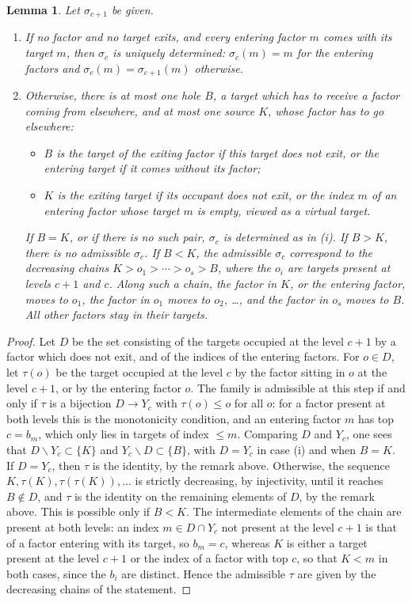 \documentclass[a4paper,12pt,leqno]{amsart}
\theoremstyle{plain}
\newtheorem{lemma}[thm]{Lemma}
\theoremstyle{definition}
\theoremstyle{definition}
\begin{document}
\begin{lemma}\label{lem:chains} Let $\sigma_{c+1}$ be given.
\begin{enumerate}
\item[(i)] If no factor and no target exits, and every entering factor $m$ comes with its target $m$,
then $\sigma_c$ is uniquely determined: $\sigma_c(m)=m$ for the entering factors and
$\sigma_c(m)=\sigma_{c+1}(m)$ otherwise.
\item[(ii)] Otherwise, there is at most one \emph{hole} $B$, a target which has to receive a factor
coming from elsewhere, and at most one \emph{source} $K$, whose factor has to go elsewhere:
\begin{itemize}
\item $B$ is the target of the exiting factor if this target does not exit, or the entering target if
it comes without its factor;
\item $K$ is the exiting target if its occupant does not exit, or the index $m$ of an entering
factor whose target $m$ is empty, viewed as a virtual target.
\end{itemize}
If $B=K$, or if there is no such pair, $\sigma_c$ is determined as in (i). If $B>K$, there is no
admissible $\sigma_c$. If $B<K$, the admissible $\sigma_c$ correspond to the decreasing chains
$K>o_1>\cdots>o_s>B$, where the $o_i$ are targets present at levels $c+1$ and $c$. Along such a
chain, the factor in $K$, or the entering factor, moves to $o_1$, the factor in $o_1$ moves to
$o_2$, …, and the factor in $o_s$ moves to $B$. All other factors stay in their targets.
\end{enumerate}
\end{lemma}

\begin{proof}
Let $D$ be the set consisting of the targets occupied at the level $c+1$ by a factor which does not
exit, and of the indices of the entering factors. For $o\in D$, let $\tau(o)$ be the target occupied
at the level $c$ by the factor sitting in $o$ at the level $c+1$, or by the entering factor $o$.
The family is admissible at this step if and only if $\tau$ is a bijection $D\rightarrow Y_c$ with
$\tau(o)\leq o$ for all $o$: for a factor present at both levels this is the monotonicity
condition, and an entering factor $m$ has top $c=b_m$, which only lies in targets of index $\leq m$.
Comparing $D$ and $Y_c$, one sees that $D\smallsetminus Y_c\subset\{K\}$ and $Y_c\smallsetminus
D\subset\{B\}$, with $D=Y_c$ in case (i) and when $B=K$. If $D=Y_c$, then $\tau$ is the identity,
by the remark above. Otherwise, the sequence $K,\tau(K),\tau(\tau(K)),\ldots$ is strictly
decreasing, by injectivity, until it reaches $B\notin D$, and $\tau$ is the identity on the
remaining elements of $D$, by the remark above. This is possible only if $B<K$. The intermediate
elements of the chain are present at both levels: an index $m\in D\cap Y_c$ not present at the
level $c+1$ is that of a factor entering with its target, so $b_m=c$, whereas $K$ is either a target
present at the level $c+1$ or the index of a factor with top $c$, so that $K<m$ in both cases,
since the $b_i$ are distinct. Hence the admissible $\tau$ are given by the decreasing chains of the statement.
\end{proof}
\end{document}
